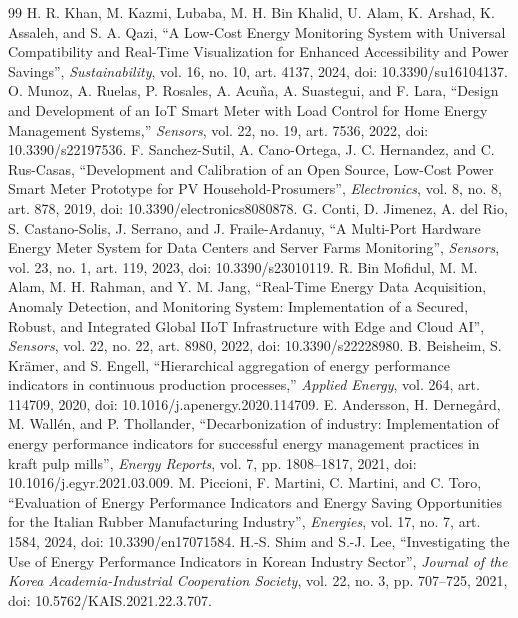 \documentclass[technologies,article,submit,pdftex,moreauthors]{Definitions/mdpi}
\begin{document}
\begin{thebibliography}{99}
 H. R. Khan, M. Kazmi, Lubaba, M. H. Bin Khalid, U. Alam, K. Arshad, K. Assaleh, and S. A. Qazi, ``A Low-Cost Energy Monitoring System with Universal Compatibility and Real-Time Visualization for Enhanced Accessibility and Power Savings'', \emph{Sustainability}, vol. 16, no. 10, art. 4137, 2024, doi: 10.3390/su16104137.
 O. Munoz, A. Ruelas, P. Rosales, A. Acu\~na, A. Suastegui, and F. Lara, ``Design and Development of an IoT Smart Meter with Load Control for Home Energy Management Systems,'' \emph{Sensors}, vol. 22, no. 19, art. 7536, 2022, doi: 10.3390/s22197536.
 F. Sanchez-Sutil, A. Cano-Ortega, J. C. Hernandez, and C. Rus-Casas, ``Development and Calibration of an Open Source, Low-Cost Power Smart Meter Prototype for PV Household-Prosumers'', \emph{Electronics}, vol. 8, no. 8, art. 878, 2019, doi: 10.3390/electronics8080878.
 G. Conti, D. Jimenez, A. del Rio, S. Castano-Solis, J. Serrano, and J. Fraile-Ardanuy, ``A Multi-Port Hardware Energy Meter System for Data Centers and Server Farms Monitoring'', \emph{Sensors}, vol. 23, no. 1, art. 119, 2023, doi: 10.3390/s23010119.
 R. Bin Mofidul, M. M. Alam, M. H. Rahman, and Y. M. Jang, ``Real-Time Energy Data Acquisition, Anomaly Detection, and Monitoring System: Implementation of a Secured, Robust, and Integrated Global IIoT Infrastructure with Edge and Cloud AI'', \emph{Sensors}, vol. 22, no. 22, art. 8980, 2022, doi: 10.3390/s22228980.
 B. Beisheim, S. Kr\"amer, and S. Engell, ``Hierarchical aggregation of energy performance indicators in continuous production processes,'' \emph{Applied Energy}, vol. 264, art. 114709, 2020, doi: 10.1016/j.apenergy.2020.114709.
 E. Andersson, H. Derneg\aa rd, M. Wall\'en, and P. Thollander, ``Decarbonization of industry: Implementation of energy performance indicators for successful energy management practices in kraft pulp mills'', \emph{Energy Reports}, vol. 7, pp. 1808--1817, 2021, doi: 10.1016/j.egyr.2021.03.009.
 M. Piccioni, F. Martini, C. Martini, and C. Toro, ``Evaluation of Energy Performance Indicators and Energy Saving Opportunities for the Italian Rubber Manufacturing Industry'', \emph{Energies}, vol. 17, no. 7, art. 1584, 2024, doi: 10.3390/en17071584.
 H.-S. Shim and S.-J. Lee, ``Investigating the Use of Energy Performance Indicators in Korean Industry Sector'', \emph{Journal of the Korea Academia-Industrial Cooperation Society}, vol. 22, no. 3, pp. 707--725, 2021, doi: 10.5762/KAIS.2021.22.3.707.

\end{thebibliography}
\end{document}

